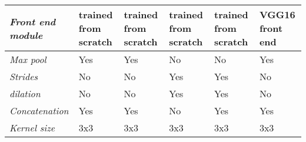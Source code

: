 \begin{table}[]
\begin{tabular}{|l|l|l|l|l|l|}
		\textit{Front end module}          & trained from scratch                                              & trained from scratch                                              & trained from scratch                                              & trained from scratch                                                                     & VGG16 front end                                                                \\ \hline
		\textit{Max pool}                  & Yes                                                               & Yes                                                               & No                                                                & No                                                                                       & Yes                                                                            \\ \hline
		\textit{Strides}                   & No                                                                & No                                                                & Yes                                                               & Yes                                                                                      & No                                                                             \\ \hline
		\textit{dilation}                  & No                                                                & No                                                                & Yes                                                               & Yes                                                                                      & No                                                                             \\ \hline
		\textit{Concatenation}             & Yes                                                               & Yes                                                               & No                                                                & Yes                                                                                      & Yes                                                                            \\ \hline
		\textit{Kernel size}               & 3x3                                                               & 3x3                                                               & 3x3                                                               & 3x3                                                                                      & 3x3                                                                            \\ \hline

\end{tabular}
\end{table}

